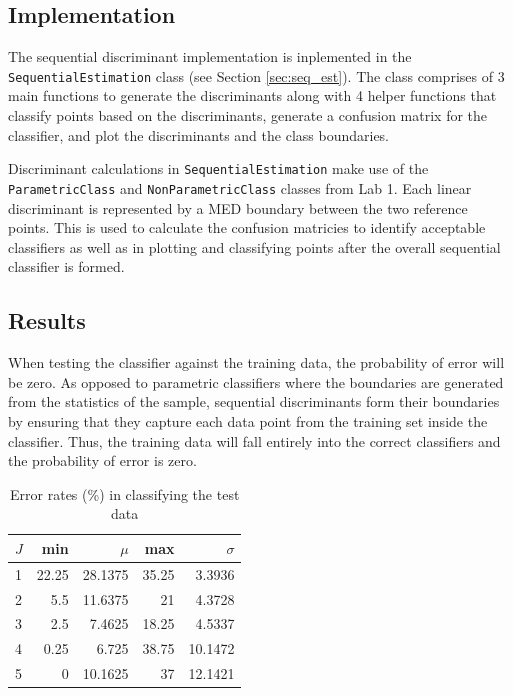 \subsection{Implementation}
\label{sec:sequ}
The sequential discriminant implementation is inplemented in the
\texttt{SequentialEstimation} class (see Section \ref{sec:seq_est}). The
class comprises of 3 main functions to generate the discriminants along with 4
helper functions that classify points based on the discriminants, generate a
confusion matrix for the classifier, and plot the discriminants and the class
boundaries.

Discriminant calculations in \texttt{SequentialEstimation} make use of the
\texttt{ParametricClass} and \texttt{NonParametricClass} classes from Lab 1.
Each linear discriminant is represented by a MED boundary between the two
reference points. This is used to calculate the confusion matricies to identify
acceptable classifiers as well as in plotting and classifying points after the
overall sequential classifier is formed.

\subsection{Results}

When testing the classifier against the training data, the probability of error
will be zero. As opposed to parametric classifiers where the boundaries are generated from
the statistics of the sample, sequential discriminants form their boundaries by
ensuring that they capture each data point from the training set inside the
classifier. Thus, the training data will fall entirely into the correct
classifiers and the probability of error is zero.

\begin{table}
\centering
\caption{Error rates (\%) in classifying the test data}
\label{tab:error_rates}
\begin{tabular}{lrrrr}
\toprule
$J$ & min & $\mu$ & max & $\sigma$\\
\midrule
1 & 22.25 & 28.1375 & 35.25 & 3.3936\\
2 & 5.5 & 11.6375 & 21 & 4.3728\\
3 & 2.5 & 7.4625 & 18.25 & 4.5337\\
4 & 0.25 & 6.725 & 38.75 & 10.1472\\
5 & 0 & 10.1625 & 37 & 12.1421\\
\bottomrule
\end{tabular}
\end{table}

